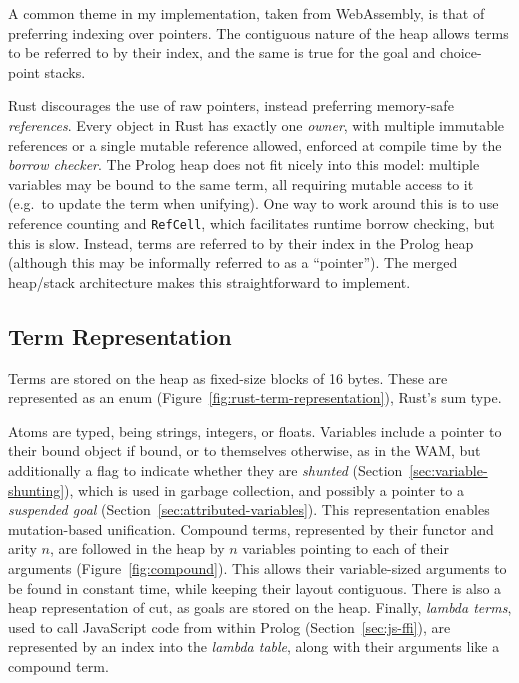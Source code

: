 \label{sec:pointers}

A common theme in my implementation, taken from WebAssembly, is that of preferring indexing over pointers. The contiguous nature of the heap allows terms to be referred to by their index, and the same is true for the goal and choice-point stacks.

Rust discourages the use of raw pointers, instead preferring memory-safe \emph{references}. Every object in Rust has exactly one \emph{owner}, with multiple immutable references or a single mutable reference allowed, enforced at compile time by the \emph{borrow checker}. The Prolog heap does not fit nicely into this model: multiple variables may be bound to the same term, all requiring mutable access to it (e.g.\ to update the term when unifying). One way to work around this is to use reference counting and \texttt{RefCell}, which facilitates runtime borrow checking, but this is slow. Instead, terms are referred to by their index in the Prolog heap (although this may be informally referred to as a ``pointer''). The merged heap/stack architecture makes this straightforward to implement.

\subsection{Term Representation}

\label{sec:term-representation}

Terms are stored on the heap as fixed-size blocks of 16 bytes. These are represented as an enum (Figure~\ref{fig:rust-term-representation}), Rust's sum type.

Atoms are typed, being strings, integers, or floats. Variables include a pointer to their bound object if bound, or to themselves otherwise, as in the WAM, but additionally a flag to indicate whether they are \emph{shunted} (Section~\ref{sec:variable-shunting}), which is used in garbage collection, and possibly a pointer to a \emph{suspended goal} (Section~\ref{sec:attributed-variables}). This representation enables mutation-based unification. Compound terms, represented by their functor and arity $n$, are followed in the heap by $n$ variables pointing to each of their arguments (Figure~\ref{fig:compound}). This allows their variable-sized arguments to be found in constant time, while keeping their layout contiguous. There is also a heap representation of cut, as goals are stored on the heap. Finally, \emph{lambda terms}, used to call JavaScript code from within Prolog (Section~\ref{sec:js-ffi}), are represented by an index into the \emph{lambda table}, along with their arguments like a compound term.

